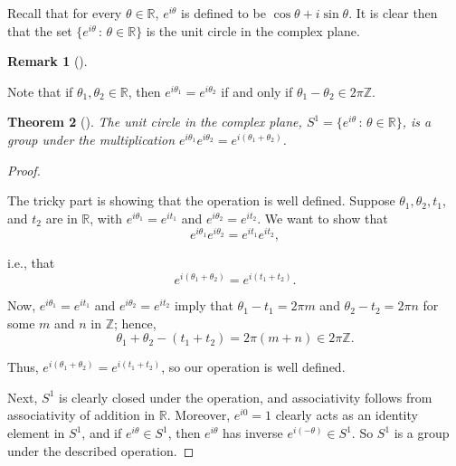 \documentclass[10pt,]{book}
\theoremstyle{plain}
\newtheorem{theorem}{Theorem}[section]
\theoremstyle{definition}
\theoremstyle{definition}
\newtheorem{remark}[theorem]{Remark}
\theoremstyle{definition}
\theoremstyle{definition}
\numberwithin{equation}{section}
\def\Z{\mathbb{Z}}
\def\R{\mathbb{R}}
\begin{document}
    Recall that for every \(\theta \in \R\),
    \(e^{i\theta}\) is defined to be \(\cos \theta + i\sin \theta\). It
    is clear then that the set \(\{e^{i\theta} \,:\, \theta\in
    \R\}\) is the unit circle in the complex plane.%
\begin{remark}[]\label{remark-43}

      Note that if \(\theta_1, \theta_2\in \R\), then
      \(e^{i\theta_1}=e^{i\theta_2}\) if and only if \(\theta_1-\theta_2
      \in 2\pi \Z\).
\end{remark}
\begin{theorem}[{}]\label{theorem-62}
The unit circle in the complex plane,
        \(S^1=\{e^{i\theta} \,:\, \theta\in \R\}\), is a group under the multiplication
        \(e^{i\theta_1}e^{i\theta_2}=e^{i(\theta_1+\theta_2)}\).
\label{notation-76}
\end{theorem}
\begin{proof}\hypertarget{proof-53}{}

      The tricky part is showing that the operation is well
      defined. Suppose \(\theta_1, \theta_2, t_1\), and \(t_2\) are in
      \(\R\), with \(e^{i\theta_1}=e^{it_1}\) and
      \(e^{i\theta_2}=e^{it_2}\). We want to show that
\begin{equation*}

        e^{i\theta_1}e^{i\theta_2}=e^{it_1}e^{it_2},
      
\end{equation*}

      i.e., that
\begin{equation*}

        e^{i(\theta_1+\theta_2)}=e^{i(t_1+t_2)}.
      
\end{equation*}

\par

      Now, \(e^{i\theta_1}=e^{it_1}\) and
      \(e^{i\theta_2}=e^{it_2}\) imply that \(\theta_1 -t_1 = 2\pi m\)
      and \(\theta_2-t_2 = 2\pi n\) for some \(m\) and \(n\) in \(\Z\);
      hence,
\begin{equation*}

        \theta_1+\theta_2-(t_1+t_2)= 2\pi(m+n) \in 2\pi\Z.
      
\end{equation*}

\par

      Thus,
      \(e^{i(\theta_1+\theta_2)}=e^{i(t_1+t_2)}\), so our operation is
      well defined.
\par

      Next, \(S^1\) is clearly closed under the operation, and
      associativity follows from associativity of addition in
      \(\R\). Moreover, \(e^{i0}=1\) clearly acts as an identity
      element in \(S^1\), and if \(e^{i\theta}\in S^1\), then
      \(e^{i\theta}\) has inverse \(e^{i(-\theta)} \in S^1\). So \(S^1\)
      is a group under the described operation.

\end{proof}
\end{document}
